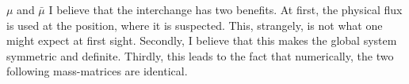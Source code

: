 \documentclass[a4paper, english, 12pt, reqno, draft]{amsart}
\theoremstyle{definition}
\theoremstyle{remark}
\numberwithin{equation}{section}
\newcommand{\setEdge}{\ensuremath{\mathcal E}}
\newcommand{\setNode}{\ensuremath{\mathcal N}}
\newcommand{\setNodeDir}{\ensuremath{\setNode_\textup D}}
\newcommand{\setNodeBar}{\ensuremath{\bar{\mathcal N}}}
\newcommand{\setNodeDirBar}{\ensuremath{\setNodeBar_\textup D}}
\newcommand{\edge}{\ensuremath{E}}
\newcommand{\node}{\ensuremath{N}}
\newcommand{\Edge}{{\ensuremath{\boldsymbol E}}}
\newcommand{\Node}{{\ensuremath{\boldsymbol N}}}
\newcommand{\Normal}{\ensuremath{\mathfrak n_\Edge}}
\renewcommand{\vec}[1]{\ensuremath{\boldsymbol{#1}}}
\newcommand{\ds}{\ensuremath{\, \textup d \sigma}}
\newcommand{\localU}{\ensuremath{\mathcal U}}
\newcommand{\localQ}{\ensuremath{\vec{\mathcal Q}}}
\newcommand{\mass}{\ensuremath{\mathfrak m}}
\begin{document}
\begin{envarwarning}{$\mu$ and $\bar \mu$}
 I believe that the interchange has two benefits. At first, the physical flux is used at the position, where it is suspected. This, strangely, is not what one might expect at first sight. Secondly, I believe that this makes the global system symmetric and definite. Thirdly, this leads to the fact that numerically, the two following mass-matrices are identical.
\end{envarwarning}
% 
\end{document}
